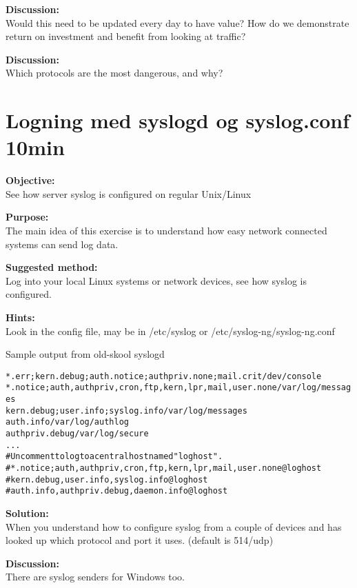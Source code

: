\documentclass[a4paper,11pt,notitlepage]{report}
\begin{document}
{\bf Discussion:}\\
Would this need to be updated every day to have value? How do we demonstrate return on investment and benefit from looking at traffic?



{\bf Discussion:}\\
Which protocols are the most dangerous, and why?


\chapter{Logning med syslogd og syslog.conf 10min}
\label{ex:syslogd-basic}

{\bf Objective:} \\
See how server syslog is configured on regular Unix/Linux

{\bf Purpose:}\\
The main idea of this exercise is to understand how easy network connected systems can send log data.


{\bf Suggested method:}\\
Log into your local Linux systems or network devices, see how syslog is configured.

{\bf Hints:}\\
Look in the config file, may be in /etc/syslog  or /etc/syslog-ng/syslog-ng.conf

Sample output from old-skool syslogd
\begin{alltt}
\small
*.err;kern.debug;auth.notice;authpriv.none;mail.crit    /dev/console
*.notice;auth,authpriv,cron,ftp,kern,lpr,mail,user.none /var/log/messages
kern.debug;user.info;syslog.info                        /var/log/messages
auth.info                                               /var/log/authlog
authpriv.debug                                          /var/log/secure
...
# Uncomment to log to a central host named "loghost".
#*.notice;auth,authpriv,cron,ftp,kern,lpr,mail,user.none        @loghost
#kern.debug,user.info,syslog.info                               @loghost
#auth.info,authpriv.debug,daemon.info                           @loghost
\end{alltt}

{\bf Solution:}\\
When you understand how to configure syslog from a couple of devices and has looked up which protocol and port it uses. (default is 514/udp)

{\bf Discussion:}\\
There are syslog senders for Windows too.
\end{document}
